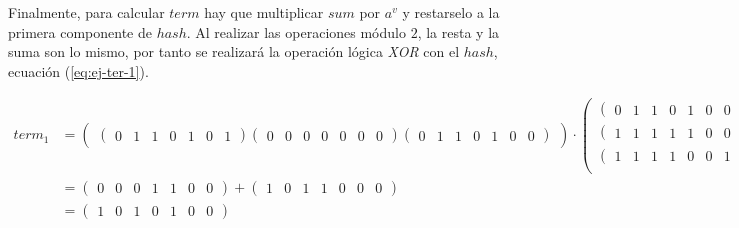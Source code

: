Finalmente, para calcular $term$ hay que multiplicar $sum$ por $a^v$ y restarselo a la primera componente de $hash$. Al realizar las operaciones módulo $2$, la resta y la suma son lo mismo, por tanto se realizará la operación lógica \textit{XOR} con el $hash$, ecuación (\ref{eq:ej-ter-1}).

\begin{equation}\label{eq:ej-ter-1}
	\begin{split}
	{term_1} &= 
		\left(\begin{matrix}
			\left(\begin{smallmatrix}0 & 1 & 1 & 0 & 1 & 0 & 1\end{smallmatrix}\right)			
			\left(\begin{smallmatrix}0 & 0 & 0 & 0 & 0 & 0 & 0\end{smallmatrix}\right)
			\left(\begin{smallmatrix}0 & 1 & 1 & 0 & 1 & 0 & 0\end{smallmatrix}\right)
		\end{matrix}\right) \cdot 
		\left(\begin{matrix}
			\left(\begin{smallmatrix}0 & 1 & 1 & 0 & 1 & 0 & 0\end{smallmatrix}\right)\\
			\left(\begin{smallmatrix}1 & 1 & 1 & 1 & 1 & 0 & 0\end{smallmatrix}\right)\\
			\left(\begin{smallmatrix}1 & 1 & 1 & 1 & 0 & 0 & 1\end{smallmatrix}\right)\\
		\end{matrix}\right)
		+ \left(\begin{smallmatrix}1 & 0 & 1 & 1 & 0 & 0 & 0\end{smallmatrix}\right)\\
		&= \left(\begin{smallmatrix}0 & 0 & 0 & 1 & 1 & 0 & 0\end{smallmatrix}\right) + 
		\left(\begin{smallmatrix}1 & 0 & 1 & 1 & 0 & 0 & 0\end{smallmatrix}\right)\\
		& = \left(\begin{smallmatrix}1 & 0 & 1 & 0 & 1 & 0 & 0\end{smallmatrix}\right)
	\end{split}
\end{equation}

